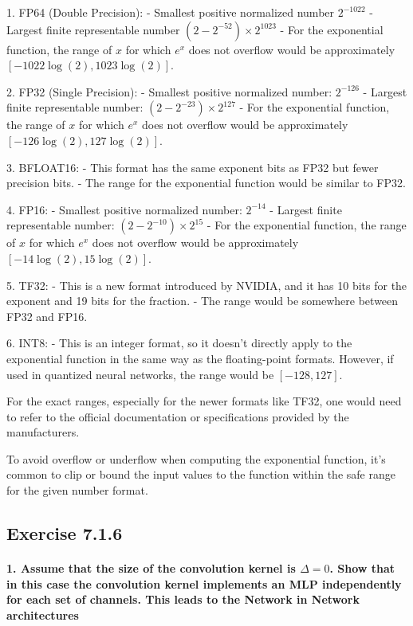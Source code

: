 1. FP64 (Double Precision):
    - Smallest positive normalized number \(2^{-1022}\)
    - Largest finite representable number \( (2-2^{-52}) \times 2^{1023} \)
    - For the exponential function, the range of \(x\) for which \(e^x\) does not overflow would be approximately \([-1022 \log(2), 1023 \log(2)]\).

2. FP32 (Single Precision):
   - Smallest positive normalized number: \(2^{-126}\)
   - Largest finite representable number: \( (2-2^{-23}) \times 2^{127} \)
   - For the exponential function, the range of \(x\) for which \(e^x\) does not overflow would be approximately \([-126 \log(2), 127 \log(2)]\).

3. BFLOAT16:
   - This format has the same exponent bits as FP32 but fewer precision bits.
   - The range for the exponential function would be similar to FP32.

4. FP16:
   - Smallest positive normalized number: \(2^{-14}\)
   - Largest finite representable number: \( (2-2^{-10}) \times 2^{15} \)
   - For the exponential function, the range of \(x\) for which \(e^x\) does not overflow would be approximately \([-14 \log(2), 15 \log(2)]\).

5. TF32:
   - This is a new format introduced by NVIDIA, and it has 10 bits for the exponent and 19 bits for the fraction.
   - The range would be somewhere between FP32 and FP16.

6. INT8:
   - This is an integer format, so it doesn't directly apply to the exponential function in the same way as the floating-point formats. However, if used in quantized neural networks, the range would be \([-128, 127]\).

For the exact ranges, especially for the newer formats like TF32, one would need to refer to the official documentation or specifications provided by the manufacturers.

To avoid overflow or underflow when computing the exponential function, it's common to clip or bound the input values to the function within the safe range for the given number format.

\subsection{Exercise 7.1.6}

\paragraph{1. Assume that the size of the convolution kernel is \(\Delta = 0 \). Show that in this case the convolution kernel implements an MLP independently for each set of channels. This leads to the Network in Network architectures}

